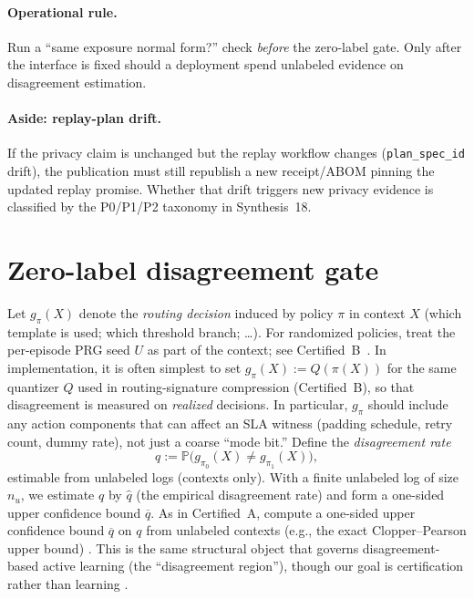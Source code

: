 \documentclass[11pt]{article}
\begin{document}
\paragraph{Operational rule.}
Run a ``same exposure normal form?'' check \emph{before} the zero-label gate.
Only after the interface is fixed should a deployment spend unlabeled evidence on disagreement estimation.

\paragraph{Aside: replay-plan drift.}
If the privacy claim is unchanged but the replay workflow changes (\texttt{plan\_spec\_id} drift), the publication must still republish a new receipt/ABOM pinning the updated replay promise.
Whether that drift triggers new privacy evidence is classified by the P0/P1/P2 taxonomy in Synthesis~18.\cite{series:planstateequiv}

\section{Zero-label disagreement gate}
Let $g_\pi(X)$ denote the \emph{routing decision} induced by policy $\pi$ in context $X$ (which template is used; which threshold branch; \ldots).
For randomized policies, treat the per-episode PRG seed $U$ as part of the context; see Certified~B~\cite{series:sigcomp}.
In implementation, it is often simplest to set $g_\pi(X):=Q(\pi(X))$ for the same quantizer $Q$ used in routing-signature compression (Certified~B), so that disagreement is measured on \emph{realized} decisions.
In particular, $g_\pi$ should include any action components that can affect an SLA witness (padding schedule, retry count, dummy rate), not just a coarse ``mode bit.''
Define the \emph{disagreement rate}
\[
q := \mathbb{P}\bigl(g_{\pi_0}(X)\neq g_{\pi_1}(X)\bigr),
\]
estimable from unlabeled logs (contexts only).
With a finite unlabeled log of size $n_u$, we estimate $q$ by $\widehat{q}$ (the empirical disagreement rate) and form a one-sided upper confidence bound $\overline{q}$.
As in Certified~A, compute a one-sided upper confidence bound $\overline{q}$ on $q$ from unlabeled contexts (e.g., the exact Clopper--Pearson upper bound) \cite{clopper1934}.
This is the same structural object that governs disagreement-based active learning (the ``disagreement region''), though our goal is certification rather than learning \cite{hanneke2014}.
\end{document}
